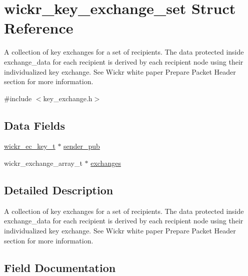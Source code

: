 \hypertarget{structwickr__key__exchange__set}{}\section{wickr\+\_\+key\+\_\+exchange\+\_\+set Struct Reference}
\label{structwickr__key__exchange__set}


A collection of key exchanges for a set of recipients. The data protected inside \textquotesingle{}exchange\+\_\+data\textquotesingle{} for each recipient is derived by each recipient node using their individualized key exchange. See Wickr white paper \textquotesingle{}Prepare Packet Header\textquotesingle{} section for more information.  




{\ttfamily \#include $<$key\+\_\+exchange.\+h$>$}

\subsection*{Data Fields}
\begin{DoxyCompactItemize}
\item 
\mbox{\hyperlink{structwickr__ec__key}{wickr\+\_\+ec\+\_\+key\+\_\+t}} $\ast$ \mbox{\hyperlink{structwickr__key__exchange__set_ac0b304b3014b3c7bfe181526c2f3fc37}{sender\+\_\+pub}}
\item 
wickr\+\_\+exchange\+\_\+array\+\_\+t $\ast$ \mbox{\hyperlink{structwickr__key__exchange__set_a7e848df6178f2e384e56bfd1f9b6d3b4}{exchanges}}
\end{DoxyCompactItemize}


\subsection{Detailed Description}
A collection of key exchanges for a set of recipients. The data protected inside \textquotesingle{}exchange\+\_\+data\textquotesingle{} for each recipient is derived by each recipient node using their individualized key exchange. See Wickr white paper \textquotesingle{}Prepare Packet Header\textquotesingle{} section for more information. 

\subsection{Field Documentation}
\mbox{\label{structwickr__key__exchange__set_a7e848df6178f2e384e56bfd1f9b6d3b4}} 
